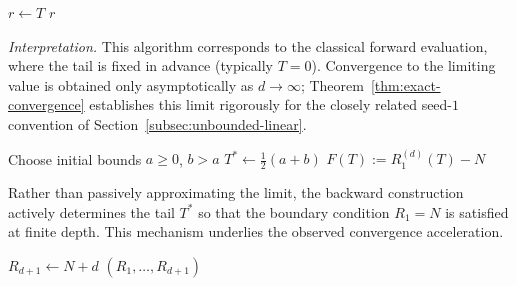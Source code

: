 \documentclass[11pt,a4paper]{amsart}
\theoremstyle{plain}
\theoremstyle{definition}
\theoremstyle{remark}
\begin{document}
\begin{algorithm}[H]
\caption{Forward evaluation of a truncated nested radical}
\label{alg:forward}
\BlankLine
$r \leftarrow T$\;
\Return $r$\;
\end{algorithm}

\medskip
\textit{Interpretation.} This algorithm corresponds to the classical forward evaluation, where the tail is fixed in advance (typically $T=0$). Convergence to the limiting value is obtained only asymptotically as $d \to \infty$; Theorem~\ref{thm:exact-convergence} establishes this limit rigorously for the closely related seed-$1$ convention of Section~\ref{subsec:unbounded-linear}.

\vspace{1em}
\begin{algorithm}[H]
\caption{Backward (rolling) construction enforcing $R_1 = N$}
\label{alg:rolling_root}
\BlankLine
Choose initial bounds $a \geq 0$, $b > a$\;
\Return $T^\ast \leftarrow \tfrac12(a+b)$\;
\medskip
{} $F(T) := R_1^{(d)}(T) - N$ 
\end{algorithm}

\medskip
Rather than passively approximating the limit, the backward construction actively determines the tail $T^\ast$ so that the boundary condition $R_1 = N$ is satisfied at finite depth. This mechanism underlies the observed convergence acceleration.

\vspace{1em}
\begin{algorithm}[H]
\caption{Verification of the identity chain for $T^\ast = N + d$}
\label{alg:identity}
\BlankLine
$R_{d+1} \leftarrow N + d$\;
\Return $(R_1,\dots,R_{d+1})$\;
\end{algorithm}
\end{document}
